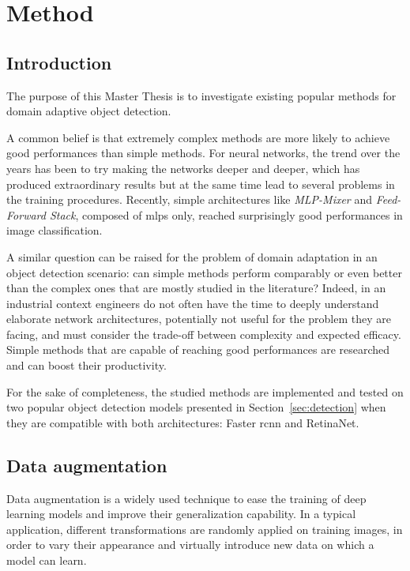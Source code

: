 \documentclass[%
    corpo=12pt,
    twoside,
    stile=classica,   
    tipotesi=magistrale,
    evenboxes,
    english
]{toptesi}
\begin{document}


\chapter{Method}
\section{Introduction}
The purpose of this Master Thesis is to investigate existing popular methods for domain adaptive object detection.

A common belief is that extremely complex methods are more likely to achieve good performances than simple methods. For neural networks, the trend over the years has been to try making the networks deeper and deeper, which has produced extraordinary results but at the same time lead to several problems in the training procedures. Recently, simple architectures like \textit{MLP-Mixer}\cite{tolstikhin2021mlpmixer} and \textit{Feed-Forward Stack}\cite{melaskyriazi2021need}, composed of \glspl{mlp} only, reached surprisingly good performances in image classification.

A similar question can be raised for the problem of domain adaptation in an object detection scenario: can simple methods perform comparably or even better than the complex ones that are mostly studied in the literature? Indeed, in an industrial context engineers do not often have the time to deeply understand elaborate network architectures, potentially not useful for the problem they are facing, and must consider the trade-off between complexity and expected efficacy. Simple methods that are capable of reaching good performances are researched and can boost their productivity.

For the sake of completeness, the studied methods are implemented and tested on two popular object detection models presented in Section~\ref{sec:detection} when they are compatible with both architectures: Faster \gls{rcnn} and RetinaNet.

\section{Data augmentation}\label{sec:dataaug}
Data augmentation is a widely used technique to ease the training of deep learning models and improve their generalization capability. In a typical application, different transformations are randomly applied on training images, in order to vary their appearance and virtually introduce new data on which a model can learn.
\end{document}

